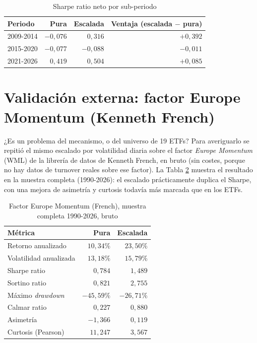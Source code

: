 \documentclass[12pt]{report} %
\begin{document}
\begin{table}[H]
\centering
\caption{Sharpe ratio neto por sub-periodo}
\label{tab:sub-periodos-etf}
\begin{tabular}{|l|r|r|r|}
\hline
\textbf{Periodo} & \textbf{Pura} & \textbf{Escalada} & \textbf{Ventaja (escalada $-$ pura)} \\
\hline
2009-2014 & $-0{,}076$ & $0{,}316$ & $+0{,}392$ \\
2015-2020 & $-0{,}077$ & $-0{,}088$ & $-0{,}011$ \\
2021-2026 & $0{,}419$ & $0{,}504$ & $+0{,}085$ \\
\hline
\end{tabular}
\end{table}

\section{Validación externa: factor Europe Momentum (Kenneth French)}

¿Es un problema del mecanismo, o del universo de 19 ETFs? Para averiguarlo se repitió el mismo escalado por volatilidad diaria sobre el factor \textit{Europe Momentum} (WML) de la librería de datos de Kenneth French, en bruto (sin costes, porque no hay datos de turnover reales sobre ese factor). La Tabla \ref{tab:french-completo} muestra el resultado en la muestra completa (1990-2026): el escalado prácticamente duplica el Sharpe, con una mejora de asimetría y curtosis todavía más marcada que en los ETFs.

\begin{table}[H]
\centering
\caption{Factor Europe Momentum (French), muestra completa 1990-2026, bruto}
\label{tab:french-completo}
\begin{tabular}{|l|r|r|}
\hline
\textbf{Métrica} & \textbf{Pura} & \textbf{Escalada} \\
\hline
Retorno anualizado & $10{,}34\%$ & $23{,}50\%$ \\
Volatilidad anualizada & $13{,}18\%$ & $15{,}79\%$ \\
Sharpe ratio & $0{,}784$ & $1{,}489$ \\
Sortino ratio & $0{,}821$ & $2{,}755$ \\
Máximo \textit{drawdown} & $-45{,}59\%$ & $-26{,}71\%$ \\
Calmar ratio & $0{,}227$ & $0{,}880$ \\
Asimetría & $-1{,}366$ & $0{,}119$ \\
Curtosis (Pearson) & $11{,}247$ & $3{,}567$ \\
\hline
\end{tabular}
\end{table}
\end{document}
